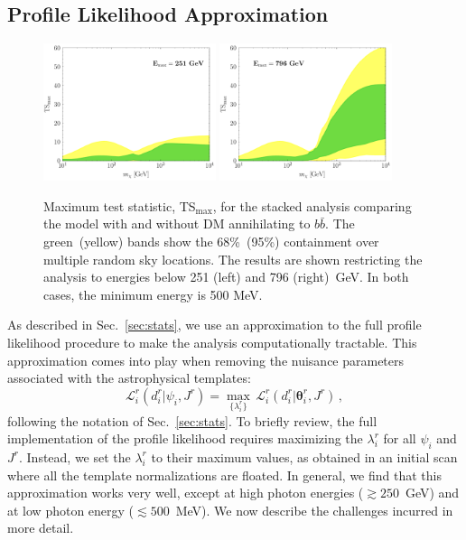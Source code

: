 \subsection{Profile Likelihood Approximation}
\begin{figure}[t]
   \centering
   \includegraphics[width=0.45\textwidth]{ch-darksky/plots//global_e251.pdf}
   \includegraphics[width=0.45\textwidth]{ch-darksky/plots//global_e796.pdf}   
   \caption{ Maximum test statistic, TS$_\text{max}$, for the stacked analysis comparing the model with and without DM annihilating to $b \bar b$.  The green~(yellow) bands show the 68\%~(95\%) containment over multiple random sky locations.  The results are shown restricting the analysis to energies below 251 (left) and 796 (right)~GeV.  In both cases, the minimum energy is 500 MeV.}
   \label{fig:LikelihoodApprox}
\end{figure}

As described in Sec.~\ref{sec:stats}, we use an approximation  to the full profile likelihood procedure to make the analysis computationally tractable.  This approximation comes into play when removing the nuisance parameters associated with the astrophysical templates:
\begin{equation}
\mathcal{L}_i^r(d_i^r | \psi_i, J^r) = \max_{\{\lambda_i^r\}}\,\mathcal{L}_i^r \left( d_i^r | \boldsymbol{\theta}_i^r, J^r \right)\,,
\label{eq:firstprofileSM}
\end{equation}
following the notation of Sec.~\ref{sec:stats}.  To briefly review, the full implementation of the profile likelihood requires maximizing the $\lambda_i^r$ for all $\psi_i$ and $J^r$.  Instead, we set the $\lambda_i^r$ to their maximum values, as obtained in an initial scan where all the template normalizations are floated. In general, we find that this approximation works very well, except at high photon energies ($\gtrsim 250$~GeV) and at low photon energy ($\lesssim 500$~MeV).  We now describe the challenges incurred in more detail.

